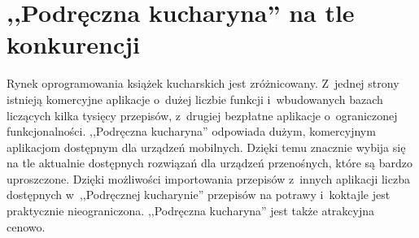 \documentclass[12pt,leqno, twoside]{mwart}
\begin{document}
\section{,,Podręczna kucharyna'' na tle konkurencji}
Rynek oprogramowania książek kucharskich jest zróżnicowany. Z~jednej strony istnieją komercyjne aplikacje o~dużej liczbie funkcji i~wbudowanych bazach liczących kilka tysięcy przepisów, z~drugiej bezpłatne aplikacje o~ograniczonej funkcjonalności. ,,Podręczna kucharyna'' odpowiada dużym, komercyjnym aplikacjom dostępnym dla urządzeń mobilnych. Dzięki temu znacznie wybija się na tle aktualnie dostępnych rozwiązań dla urządzeń przenośnych, które są bardzo uproszczone. Dzięki możliwości importowania przepisów z~innych aplikacji liczba dostępnych w~,,Podręcznej kucharynie'' przepisów na potrawy i~koktajle jest praktycznie nieograniczona. ,,Podręczna kucharyna'' jest także atrakcyjna cenowo.
\end{document}
